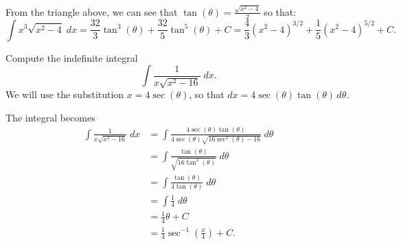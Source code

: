 \documentclass{ximera}
\begin{document}
\begin{example}[example 5]
From the triangle above, we can see that $\tan(\theta) = \frac{\sqrt{x^2-4}}{2}$ so that:
\[
\int x^3\sqrt{x^2-4} \; dx =  \frac{32}{3} \tan^3(\theta) + \frac{32}{5} \tan^5(\theta) + C =  \frac43 (x^2 - 4)^{3/2} + 
\frac{1}{5} (x^2 - 4)^{5/2} + C.
\]

\end{example}






\begin{example}[example 6]
Compute the indefinite integral
\[
\int \frac{1}{x\sqrt{x^2-16}} \; dx.
\]
We will use the substitution $x = 4\sec(\theta)$,
so that $dx = 4\sec(\theta)\tan(\theta) \, d\theta$.

The integral becomes
\begin{align*}
\int \frac{1}{x\sqrt{x^2-16}}\; dx &= \int \frac{4\sec(\theta)\tan(\theta)}{4\sec(\theta)\sqrt{16\sec^2(\theta)-16}}\; d\theta\\[6pt]
                                 &=  \int \frac{\tan(\theta)}{\sqrt{16\tan^2(\theta)}}\; d\theta\\[6pt]
                                 &=  \int \frac{\tan(\theta)}{4\tan(\theta)}\; d\theta\\[6pt]
                                  &=  \int \frac14 \; d\theta\\[6pt]
                                  &= \frac14 \theta + C\\[6pt]
                                  &= \frac14 \sec^{-1}\left(\frac{x}{4}\right)+C.
\end{align*}

\end{example}
\end{document}
